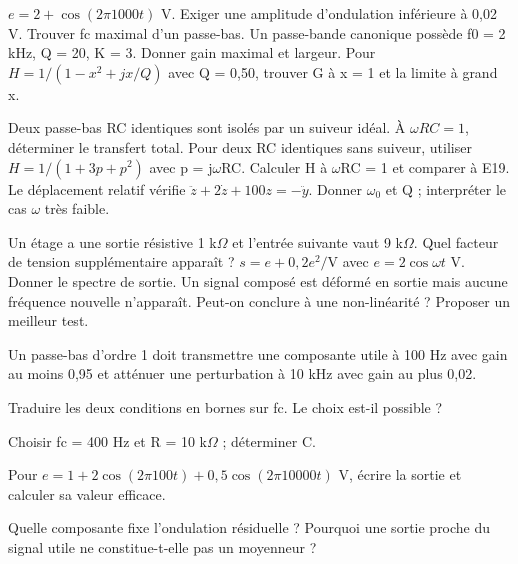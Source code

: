 $e=2+\cos(2\pi1000t)$ V. Exiger une amplitude d’ondulation inférieure à 0,02 V. Trouver fc maximal d’un passe-bas.
Un passe-bande canonique possède f0 = 2 kHz, Q = 20, K = 3. Donner gain maximal et largeur.
Pour $H=1/(1-x^2+jx/Q)$ avec Q = 0,50, trouver G à x = 1 et la limite à grand x.


Deux passe-bas RC identiques sont isolés par un suiveur idéal. À $\omega RC=1$, déterminer le transfert total.
Pour deux RC identiques sans suiveur, utiliser $H=1/(1+3p+p^2)$ avec p = j\ensuremath{\omega}RC. Calculer H à \ensuremath{\omega}RC = 1 et comparer à E19.
Le déplacement relatif vérifie $\ddot z+2\dot z+100z=-\ddot y$. Donner \ensuremath{\omega_0} et Q ; interpréter le cas \ensuremath{\omega} très faible.


Un étage a une sortie résistive 1 k$\Omega$ et l’entrée suivante vaut 9 k$\Omega$. Quel facteur de tension supplémentaire apparaît ?
$s=e+0{,}2e^2/\mathrm V$ avec $e=2\cos\omega t$ V. Donner le spectre de sortie.
Un signal composé est déformé en sortie mais aucune fréquence nouvelle n’apparaît. Peut-on conclure à une non-linéarité ? Proposer un meilleur test.


\label{ex-D1}
Un passe-bas d’ordre 1 doit transmettre une composante utile à 100 Hz avec gain au moins 0,95 et atténuer une perturbation à 10 kHz avec gain au plus 0,02.\begin{questions}
\item Traduire les deux conditions en bornes sur fc. Le choix est-il possible ?
\item Choisir fc = 400 Hz et R = 10 k$\Omega$ ; déterminer C.
\item Pour $e=1+2\cos(2\pi100t)+0{,}5\cos(2\pi10000t)$ V, écrire la sortie et calculer sa valeur efficace.
\item Quelle composante fixe l’ondulation résiduelle ? Pourquoi une sortie proche du signal utile ne constitue-t-elle pas un moyenneur ?
\end{questions}


